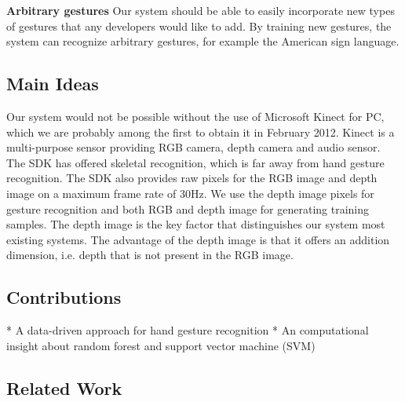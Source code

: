 \textbf{Arbitrary gestures} Our system should be able to easily incorporate new types of gestures that any developers would like to add. By training new gestures, the system can recognize arbitrary gestures, for example the American sign language. 

\subsection{Main Ideas}
Our system would not be possible without the use of Microsoft Kinect for PC, which we are probably among the first to obtain it in February 2012. Kinect is a multi-purpose sensor providing RGB camera, depth camera and audio sensor. The SDK has offered skeletal recognition, which is far away from hand gesture recognition. The SDK also provides raw pixels for the RGB image and depth image on a maximum frame rate of 30Hz. We use the depth image pixels for gesture recognition and both RGB and depth image for generating training samples. The depth image is the key factor that distinguishes our system most existing systems. The advantage of the depth image is that it offers an addition dimension, i.e. depth that is not present in the RGB image.      

\subsection{Contributions}
* A data-driven approach for hand gesture recognition
* An computational insight about random forest and support vector machine (SVM)

\subsection{Related Work}
 